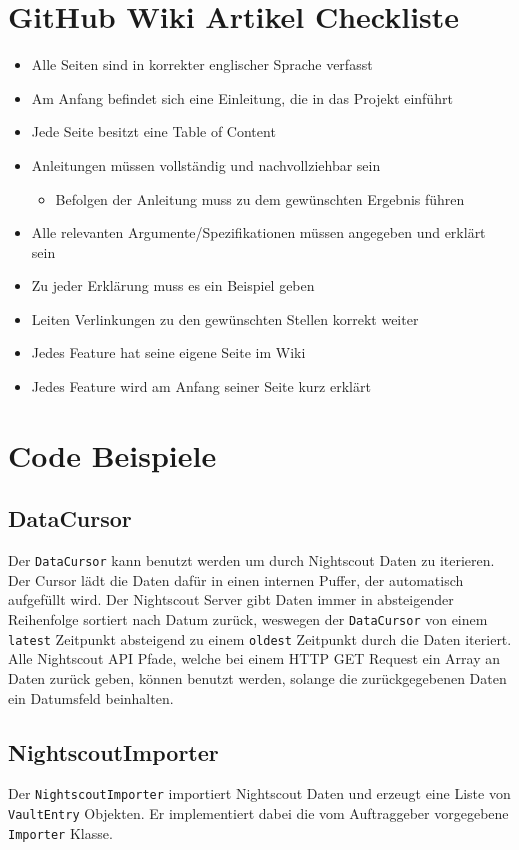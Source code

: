 \documentclass[accentcolor=tud0b,12pt,paper=a4]{tudreport}
\begin{document}
\section{GitHub Wiki Artikel Checkliste}
\begin{itemize}
\item Alle Seiten sind in korrekter englischer Sprache verfasst
\item Am Anfang befindet sich eine Einleitung, die in das Projekt einführt
\item Jede Seite besitzt eine Table of Content
\item Anleitungen müssen vollständig und nachvollziehbar sein
	\begin{itemize}
	\item Befolgen der Anleitung muss zu dem gewünschten Ergebnis führen
	\end{itemize}
\item Alle relevanten Argumente/Spezifikationen müssen angegeben und erklärt sein
\item Zu jeder Erklärung muss es ein Beispiel geben
\item Leiten Verlinkungen zu den gewünschten Stellen korrekt weiter
\item Jedes Feature hat seine eigene Seite im Wiki
\item Jedes Feature wird am Anfang seiner Seite kurz erklärt
\end{itemize}

\section{Code Beispiele}
\subsection{DataCursor}
Der \texttt{DataCursor} kann benutzt werden um durch Nightscout Daten zu iterieren. Der Cursor lädt die Daten dafür in einen internen Puffer, der automatisch aufgefüllt wird. Der Nightscout Server gibt Daten immer in absteigender Reihenfolge sortiert nach Datum zurück, weswegen der \texttt{DataCursor} von einem \texttt{latest} Zeitpunkt absteigend zu einem \texttt{oldest} Zeitpunkt durch die Daten iteriert. Alle Nightscout API Pfade, welche bei einem HTTP GET Request ein Array an Daten zurück geben, können benutzt werden, solange die zurückgegebenen Daten ein Datumsfeld beinhalten.


\subsection{NightscoutImporter}
Der \texttt{NightscoutImporter} importiert Nightscout Daten und erzeugt eine Liste von \texttt{VaultEntry} Objekten. Er implementiert dabei die vom Auftraggeber vorgegebene \texttt{Importer} Klasse.

\end{document}
